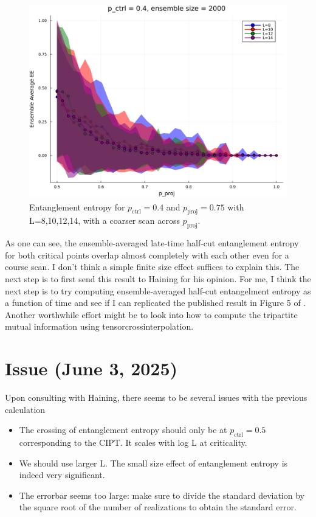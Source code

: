 \documentclass[11pt,a4paper]{article}
\begin{document}
\begin{figure}[H]
    \centering
    \includegraphics[width=0.8\linewidth]{pctrl0.4pproj0.7coursesmallsize.png}
    \caption{Entanglement entropy for $p_\text{ctrl}=0.4$ and $p_\text{proj}=0.75$ with L=8,10,12,14, with a coarser scan across $p_\text{proj}$.}
    \label{fig:pctrl0.4pproj0.7coursesmallsize}
\end{figure}

As one can see, the ensemble-averaged late-time half-cut entanglement entropy for both critical points overlap almost completely with each other even for a course scan. I don't think a simple finite size effect suffices to explain this. The next step is to first send this result to Haining for his opinion. For me, I think the next step is to try computing ensemble-averaged half-cut entangelment entropy as a function of time and see if I can replicated the published result in Figure 5 of \cite{Pan_2024}. Another worthwhile effort might be to look into how to compute the tripartite mutual information using tensorcrossinterpolation.

\section{Issue (June 3, 2025)}

Upon consulting with Haining, there seems to be several issues with the previous calculation

\begin{itemize}
    \item The crossing of entanglement entropy should only be at $p_\text{ctrl}=0.5$ corresponding to the CIPT. It scales with log L at criticality.
    \item We should use larger L. The small size effect of entanglement entropy is indeed very significant.
    \item The errorbar seems too large: make sure to divide the standard deviation by the square root of the number of realizations to obtain the standard error.
\end{itemize}
\end{document}
